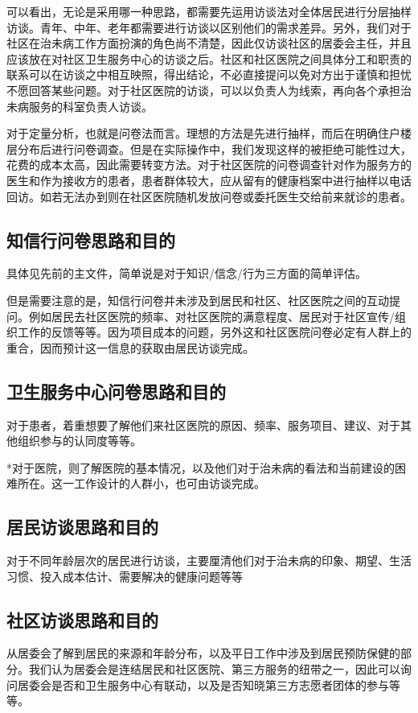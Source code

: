 \documentclass{article}
\begin{document}
    可以看出，无论是采用哪一种思路，都需要先运用访谈法对全体居民进行分层抽样访谈。青年、中年、老年都需要进行访谈以区别他们的需求差异。另外，我们对于社区在治未病工作方面扮演的角色尚不清楚，因此仅访谈社区的居委会主任，并且应该放在对社区卫生服务中心的访谈之后。社区和社区医院之间具体分工和职责的联系可以在访谈之中相互映照，得出结论，不必直接提问以免对方出于谨慎和担忧不愿回答某些问题。对于社区医院的访谈，可以以负责人为线索，再向各个承担治未病服务的科室负责人访谈。
    
    对于定量分析，也就是问卷法而言。理想的方法是先进行抽样，而后在明确住户楼层分布后进行问卷调查。但是在实际操作中，我们发现这样的被拒绝可能性过大，花费的成本太高，因此需要转变方法。对于社区医院的问卷调查针对作为服务方的医生和作为接收方的患者，患者群体较大，应从留有的健康档案中进行抽样以电话回访。如若无法办到则在社区医院随机发放问卷或委托医生交给前来就诊的患者。
    
    \subsection{知信行问卷思路和目的}
    具体见先前的主文件，简单说是对于知识/信念/行为三方面的简单评估。
    
    但是需要注意的是，知信行问卷并未涉及到居民和社区、社区医院之间的互动提问。例如居民去社区医院的频率、对社区医院的满意程度、居民对于社区宣传/组织工作的反馈等等。因为项目成本的问题，另外这和社区医院问卷必定有人群上的重合，因而预计这一信息的获取由居民访谈完成。
        \subsection{卫生服务中心问卷思路和目的}
        对于患者，着重想要了解他们来社区医院的原因、频率、服务项目、建议、对于其他组织参与的认同度等等。
        
        *对于医院，则了解医院的基本情况，以及他们对于治未病的看法和当前建设的困难所在。这一工作设计的人群小，也可由访谈完成。
            \subsection{居民访谈思路和目的}
            对于不同年龄层次的居民进行访谈，主要厘清他们对于治未病的印象、期望、生活习惯、投入成本估计、需要解决的健康问题等等
             \subsection{社区访谈思路和目的}
            从居委会了解到居民的来源和年龄分布，以及平日工作中涉及到居民预防保健的部分。我们认为居委会是连结居民和社区医院、第三方服务的纽带之一，因此可以询问居委会是否和卫生服务中心有联动，以及是否知晓第三方志愿者团体的参与等等。
\end{document}
